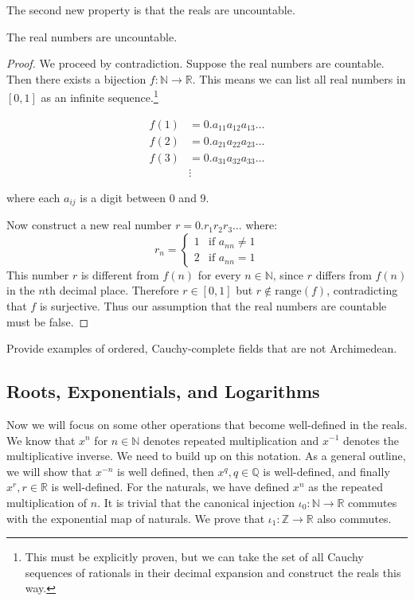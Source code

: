   The second new property is that the reals are uncountable. 

  \begin{theorem}
    The real numbers are uncountable.
  \end{theorem}
  \begin{proof}
    We proceed by contradiction. Suppose the real numbers are countable. Then there exists a bijection $f: \mathbb{N} \to \mathbb{R}$. This means we can list all real numbers in $[0,1]$ as an infinite sequence.\footnote{This must be explicitly proven, but we can take the set of all Cauchy sequences of rationals in their decimal expansion and construct the reals this way.}
    
    \begin{align*}
      f(1) &= 0.a_{11}a_{12}a_{13}\dots \\
      f(2) &= 0.a_{21}a_{22}a_{23}\dots \\
      f(3) &= 0.a_{31}a_{32}a_{33}\dots \\
      &\vdots
    \end{align*}
    
    where each $a_{ij}$ is a digit between 0 and 9.
    
    Now construct a new real number $r = 0.r_1r_2r_3\dots$ where:
    \begin{equation}
      r_n = \begin{cases}
        1 & \text{if } a_{nn} \neq 1 \\
        2 & \text{if } a_{nn} = 1
      \end{cases}
    \end{equation}
    This number $r$ is different from $f(n)$ for every $n \in \mathbb{N}$, since $r$ differs from $f(n)$ in the $n$th decimal place. Therefore $r \in [0,1]$ but $r \notin \text{range}(f)$, contradicting that $f$ is surjective. Thus our assumption that the real numbers are countable must be false.
  \end{proof}

  Provide examples of ordered, Cauchy-complete fields that are not Archimedean.  

\subsection{Roots, Exponentials, and Logarithms} 

  Now we will focus on some other operations that become well-defined in the reals. We know that $x^{n}$ for $n \in \mathbb{N}$ denotes repeated multiplication and $x^{-1}$ denotes the multiplicative inverse. We need to build up on this notation. As a general outline, we will show that $x^{-n}$ is well defined, then $x^q, q \in \mathbb{Q}$ is well-defined, and finally $x^r, r \in \mathbb{R}$ is well-defined. For the naturals, we have defined $x^n$ as the repeated multiplication of $n$. It is trivial that the canonical injection $\iota_0: \mathbb{N} \rightarrow \mathbb{R}$ commutes with the exponential map of naturals. We prove that $\iota_1: \mathbb{Z} \rightarrow \mathbb{R}$ also commutes. 

